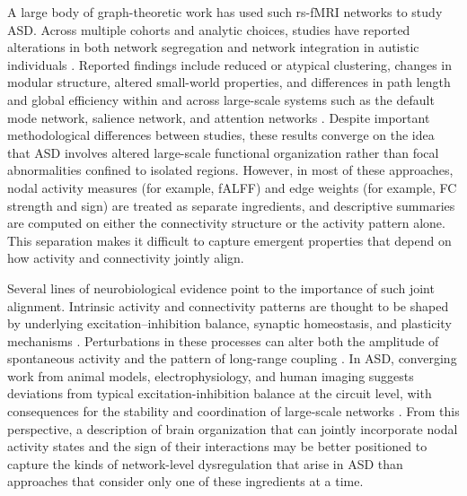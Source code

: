 \documentclass[10pt,letterpaper]{article}
\begin{document}
A large body of graph-theoretic work has used such rs-fMRI networks to study ASD. Across multiple
cohorts and analytic choices, studies have reported alterations in both network segregation and
network integration in autistic individuals \cite{assaf2010abnormal,10.3389/fnhum.2013.00458,Uddin2013,Smith:2013fc}.
Reported findings include reduced or atypical clustering, changes in modular structure, altered
small-world properties, and differences in path length and global efficiency within and across
large-scale systems such as the default mode network, salience network, and attention networks
\cite{assaf2010abnormal,10.3389/fnhum.2013.00458}. Despite important methodological differences
between studies, these results converge on the idea that ASD involves altered large-scale functional
organization rather than focal abnormalities confined to isolated regions. However, in most of these
approaches, nodal activity measures (for example, fALFF) and edge weights (for example, FC strength
and sign) are treated as separate ingredients, and descriptive summaries are computed on either the
connectivity structure or the activity pattern alone. This separation makes it difficult to capture
emergent properties that depend on how activity and connectivity jointly align.

Several lines of neurobiological evidence point to the importance of such joint alignment. Intrinsic
activity and connectivity patterns are thought to be shaped by underlying excitation--inhibition
balance, synaptic homeostasis, and plasticity mechanisms \cite{Yizhar2011,Dinstein2011}.
Perturbations in these processes can alter both the amplitude of spontaneous activity and the pattern
of long-range coupling \cite{Yizhar2011,Dinstein2011}. In ASD, converging work from animal models,
electrophysiology, and human imaging suggests deviations from typical excitation-inhibition balance
at the circuit level, with consequences for the stability and coordination of large-scale networks
\cite{Uddin2013}. From this perspective, a description of brain organization that can jointly
incorporate nodal activity states and the sign of their interactions may be better positioned to
capture the kinds of network-level dysregulation that arise in ASD than approaches that consider
only one of these ingredients at a time.
\end{document}
